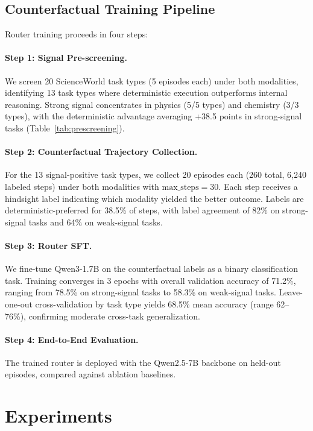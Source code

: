 \documentclass[11pt,a4paper]{article}
\begin{document}
\subsection{Counterfactual Training Pipeline}

Router training proceeds in four steps:

\paragraph{Step 1: Signal Pre-screening.} We screen 20 ScienceWorld task types (5 episodes each) under both modalities, identifying 13 task types where deterministic execution outperforms internal reasoning. Strong signal concentrates in physics (5/5 types) and chemistry (3/3 types), with the deterministic advantage averaging +38.5 points in strong-signal tasks (Table~\ref{tab:prescreening}).

\paragraph{Step 2: Counterfactual Trajectory Collection.} For the 13 signal-positive task types, we collect 20 episodes each (260 total, 6{,}240 labeled steps) under both modalities with $\text{max\_steps}{=}30$. Each step receives a hindsight label indicating which modality yielded the better outcome. Labels are deterministic-preferred for 38.5\% of steps, with label agreement of 82\% on strong-signal tasks and 64\% on weak-signal tasks.

\paragraph{Step 3: Router SFT.} We fine-tune Qwen3-1.7B on the counterfactual labels as a binary classification task. Training converges in 3 epochs with overall validation accuracy of 71.2\%, ranging from 78.5\% on strong-signal tasks to 58.3\% on weak-signal tasks. Leave-one-out cross-validation by task type yields 68.5\% mean accuracy (range 62--76\%), confirming moderate cross-task generalization.

\paragraph{Step 4: End-to-End Evaluation.} The trained router is deployed with the Qwen2.5-7B backbone on held-out episodes, compared against ablation baselines.

\section{Experiments}
\end{document}
